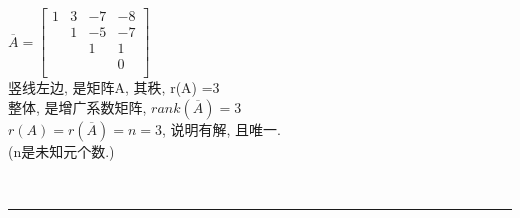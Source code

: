 \documentclass[UTF8]{ctexart}
\begin{document}
\begin{myEnvSample}
$\overline{A}=\left[ \begin{array}{ccc|c}
	1&		3&		-7&		-8\\
	&		1&		-5&		-7\\
	&		&		1&		1\\
	&		&		&		0\\
\end{array} \right]$\\

竖线左边, 是矩阵A, 其秩, r(A) =3 \\
整体, 是增广系数矩阵, $ rank(\overline{A}) = 3$ \\
$ r(A) =  r(\overline{A}) = n =  3 $, 说明有解, 且唯一. \\
(n是未知元个数.)
\end{myEnvSample}


~\\
\hrule
~\\
\end{document}

